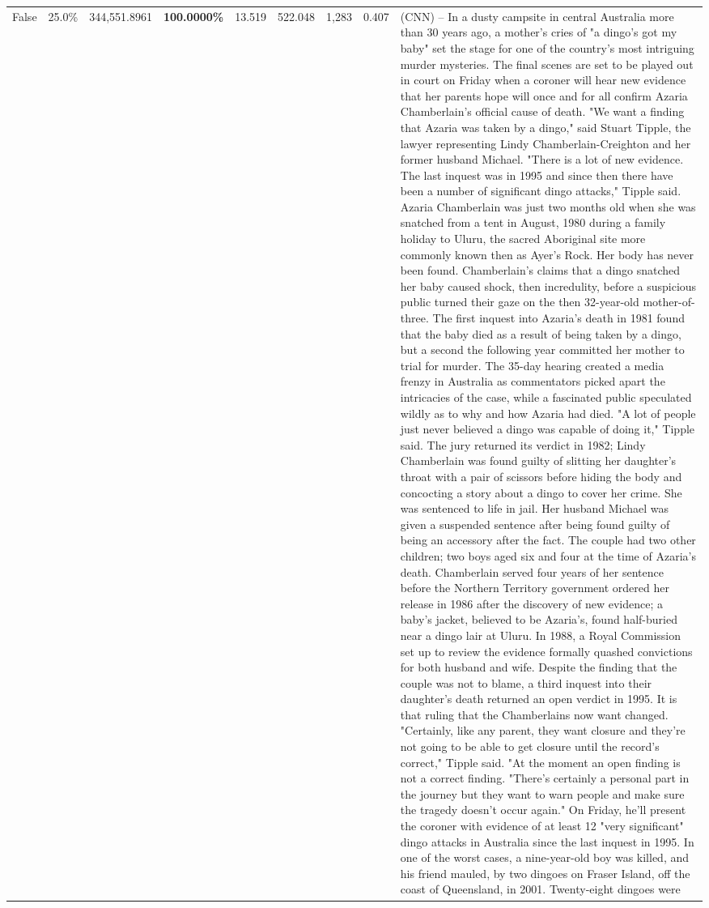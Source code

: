 \begin{table}[H]
\begin{tabular}{lllrlllll}
False & 25.0\% & 344,551.8961 & \bfseries \color{red} 100.0000\% & 13.519 & 522.048 & 1,283 & 0.407 & (CNN) -- In a dusty campsite in central Australia more than 30 years ago, a mother's cries of "a dingo's got my baby" set the stage for one of the country's most intriguing murder mysteries. The final scenes are set to be played out in court on Friday when a coroner will hear new evidence that her parents hope will once and for all confirm Azaria Chamberlain's official cause of death. "We want a finding that Azaria was taken by a dingo," said Stuart Tipple, the lawyer representing Lindy Chamberlain-Creighton and her former husband Michael. "There is a lot of new evidence. The last inquest was in 1995 and since then there have been a number of significant dingo attacks," Tipple said. Azaria Chamberlain was just two months old when she was snatched from a tent in August, 1980 during a family holiday to Uluru, the sacred Aboriginal site more commonly known then as Ayer's Rock. Her body has never been found. Chamberlain's claims that a dingo snatched her baby caused shock, then incredulity, before a suspicious public turned their gaze on the then 32-year-old mother-of-three. The first inquest into Azaria's death in 1981 found that the baby died as a result of being taken by a dingo, but a second the following year committed her mother to trial for murder. The 35-day hearing created a media frenzy in Australia as commentators picked apart the intricacies of the case, while a fascinated public speculated wildly as to why and how Azaria had died. "A lot of people just never believed a dingo was capable of doing it," Tipple said. The jury returned its verdict in 1982; Lindy Chamberlain was found guilty of slitting her daughter's throat with a pair of scissors before hiding the body and concocting a story about a dingo to cover her crime. She was sentenced to life in jail. Her husband Michael was given a suspended sentence after being found guilty of being an accessory after the fact. The couple had two other children; two boys aged six and four at the time of Azaria's death. Chamberlain served four years of her sentence before the Northern Territory government ordered her release in 1986 after the discovery of new evidence; a baby's jacket, believed to be Azaria's, found half-buried near a dingo lair at Uluru. In 1988, a Royal Commission set up to review the evidence formally quashed convictions for both husband and wife. Despite the finding that the couple was not to blame, a third inquest into their daughter's death returned an open verdict in 1995. It is that ruling that the Chamberlains now want changed. "Certainly, like any parent, they want closure and they're not going to be able to get closure until the record's correct," Tipple said. "At the moment an open finding is not a correct finding. "There's certainly a personal part in the journey but they want to warn people and make sure the tragedy doesn't occur again." On Friday, he'll present the coroner with evidence of at least 12 "very significant" dingo attacks in Australia since the last inquest in 1995. In one of the worst cases, a nine-year-old boy was killed, and his friend mauled, by two dingoes on Fraser Island, off the coast of Queensland, in 2001. Twenty-eight dingoes were 
\end{tabular}
\end{table}
